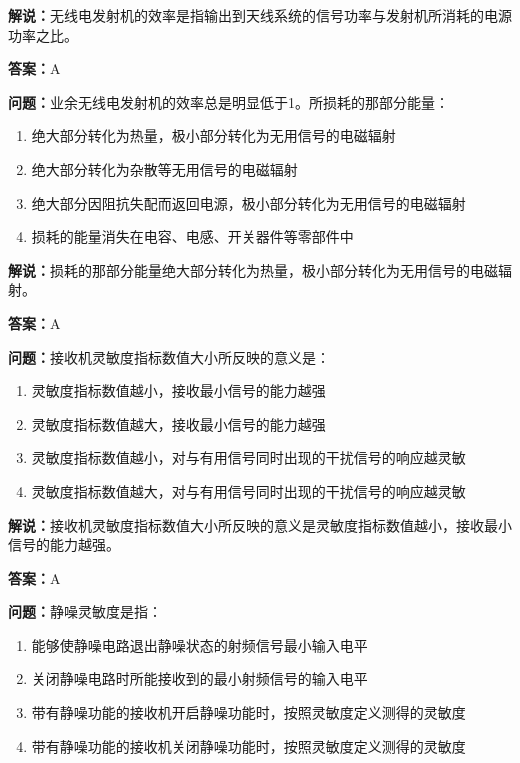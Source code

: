 \textbf{解说：}无线电发射机的效率是指输出到天线系统的信号功率与发射机所消耗的电源功率之比。%

\textbf{答案：}A

\textbf{问题：}业余无线电发射机的效率总是明显低于1。所损耗的那部分能量：

\begin{enumerate}[label=\Alph*), leftmargin=3em]
	\item 绝大部分转化为热量，极小部分转化为无用信号的电磁辐射
	\item 绝大部分转化为杂散等无用信号的电磁辐射
	\item 绝大部分因阻抗失配而返回电源，极小部分转化为无用信号的电磁辐射
	\item 损耗的能量消失在电容、电感、开关器件等零部件中
\end{enumerate}

\textbf{解说：}损耗的那部分能量绝大部分转化为热量，极小部分转化为无用信号的电磁辐射。%

\textbf{答案：}A

\textbf{问题：}接收机灵敏度指标数值大小所反映的意义是：

\begin{enumerate}[label=\Alph*), leftmargin=3em]
	\item 灵敏度指标数值越小，接收最小信号的能力越强
	\item 灵敏度指标数值越大，接收最小信号的能力越强
	\item 灵敏度指标数值越小，对与有用信号同时出现的干扰信号的响应越灵敏
	\item 灵敏度指标数值越大，对与有用信号同时出现的干扰信号的响应越灵敏
\end{enumerate}

\textbf{解说：}接收机灵敏度指标数值大小所反映的意义是灵敏度指标数值越小，接收最小信号的能力越强。%

\textbf{答案：}A

\textbf{问题：}静噪灵敏度是指：

\begin{enumerate}[label=\Alph*), leftmargin=3em]
	\item 能够使静噪电路退出静噪状态的射频信号最小输入电平
	\item 关闭静噪电路时所能接收到的最小射频信号的输入电平
	\item 带有静噪功能的接收机开启静噪功能时，按照灵敏度定义测得的灵敏度
	\item 带有静噪功能的接收机关闭静噪功能时，按照灵敏度定义测得的灵敏度
\end{enumerate}

